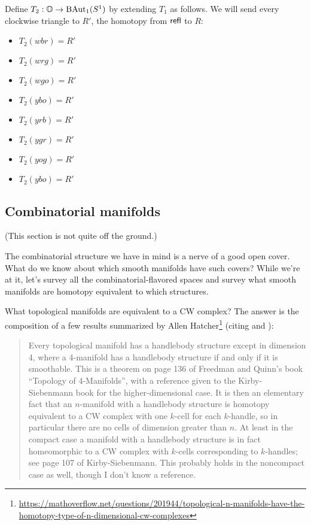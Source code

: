 \begin{mydef}
Define \( T_2:\mathbb{O}\to\mathrm{BAut}_1(S^1) \) by extending \( T_1 \) as follows. We will send every clockwise triangle to \( R' \), the homotopy from \( \mathsf{refl} \) to \( R \):
\begin{itemize}
\item \( T_2(wbr)=R' \) 
\item \( T_2(wrg)=R' \)
\item \( T_2(wgo)=R' \)
\item \( T_2(ybo)=R' \)
\item \( T_2(yrb)=R' \) 
\item \( T_2(ygr)=R' \)
\item \( T_2(yog)=R' \)
\item \( T_2(ybo)=R' \)
\end{itemize}
\end{mydef}

\subsection{Combinatorial manifolds}\label{combinatorial-manifolds}

(This section is not quite off the ground.)

The combinatorial structure we have in mind is a nerve of a good open
cover. What do we know about which smooth manifolds have such covers?
While we're at it, let's survey all the combinatorial-flavored spaces
and survey what smooth manifolds are homotopy equivalent to which
structures.

What topological manifolds are equivalent to a CW complex? The answer is
the composition of a few results summarized by Allen Hatcher\footnote{\url{https://mathoverflow.net/questions/201944/topological-n-manifolds-have-the-homotopy-type-of-n-dimensional-cw-complexes}}
(citing \cite{kirby_siebenmann} and \cite{freedman_quinn}):

\begin{quote}
Every topological manifold has a handlebody structure except in
dimension 4, where a 4-manifold has a handlebody structure if and only
if it is smoothable. This is a theorem on page 136 of Freedman and
Quinn's book ``Topology of 4-Manifolds'', with a reference given to the
Kirby-Siebenmann book for the higher-dimensional case. It is then an
elementary fact that an \(n\)-manifold with a handlebody structure is
homotopy equivalent to a CW complex with one \(k\)-cell for each
\(k\)-handle, so in particular there are no cells of dimension greater
than \(n\). At least in the compact case a manifold with a handlebody
structure is in fact homeomorphic to a CW complex with \(k\)-cells
corresponding to \(k\)-handles; see page 107 of Kirby-Siebenmann. This
probably holds in the noncompact case as well, though I don't know a
reference.
\end{quote}

